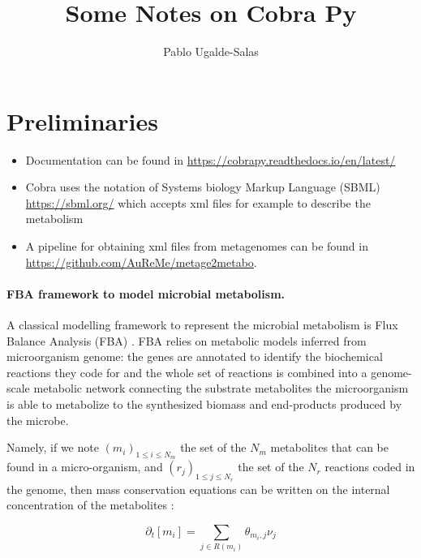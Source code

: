 \documentclass{article}
\title{Some Notes on Cobra Py}
\author{Pablo Ugalde-Salas}
\date{}
\begin{document}
	\maketitle
\section{Preliminaries}
\begin{itemize}
\item Documentation can be found in \url{https://cobrapy.readthedocs.io/en/latest/}
\item Cobra uses the notation of Systems biology Markup Language (SBML) \url{https://sbml.org/}	which accepts xml files for example to describe the metabolism
\item A pipeline for obtaining xml files from metagenomes can be found in \url{https://github.com/AuReMe/metage2metabo}. 
\end{itemize}
	

\paragraph{FBA framework to model microbial metabolism. \label{sec:FBA}}


A classical modelling framework to represent the microbial metabolism is Flux Balance Analysis (FBA) \cite{Orth.2010,schellenberger2011quantitative}. FBA relies on metabolic models inferred from microorganism genome: the genes are annotated to identify the biochemical reactions they code for and the whole set of reactions is combined into a genome-scale metabolic network connecting the substrate metabolites the microorganism is able to metabolize to the synthesized biomass and end-products produced by the microbe. 

Namely, if we note $(m_i)_{1\leqslant i \leqslant N_m}$ the set of the $N_m$ metabolites that can be found in a micro-organism, and $(r_j)_{1\leqslant j \leqslant N_r}$ the set of the $N_r$ reactions coded in the genome, then mass conservation equations can be written on the internal concentration of the metabolites :

\begin{equation}
	\label{eq:mass-conservation}
	\partial_t [m_i] = \sum_{j \in R(m_i)} \theta_{m_i,j} \nu_{j}
\end{equation} 
\end{document}
